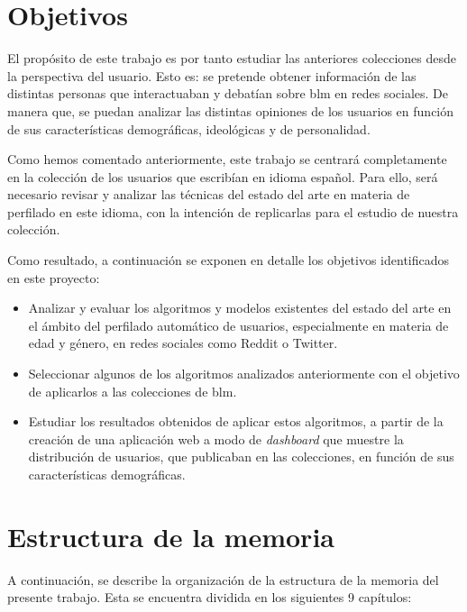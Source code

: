\section{Objetivos}
El propósito de este trabajo es por tanto estudiar las anteriores colecciones desde la perspectiva del usuario. Esto es: se pretende obtener información de las distintas personas que interactuaban y debatían sobre \acrshort{blm} en redes sociales. De manera que, se puedan analizar las distintas opiniones de los usuarios en función de sus características demográficas, ideológicas y de personalidad.

Como hemos comentado anteriormente, este trabajo se centrará completamente en la colección de los usuarios que escribían en idioma español. Para ello, será necesario revisar y analizar las técnicas del estado del arte en materia de perfilado en este idioma, con la intención de replicarlas para el estudio de nuestra colección.

Como resultado, a continuación se exponen en detalle los objetivos identificados en este proyecto:

\begin{itemize}
    \item Analizar y evaluar los algoritmos y modelos existentes del estado del arte en el ámbito del perfilado automático  de usuarios, especialmente en materia de edad y género, en redes sociales como Reddit o Twitter.
    \item Seleccionar algunos de los algoritmos analizados anteriormente con el objetivo de aplicarlos a las colecciones de \acrshort{blm}.
    \item Estudiar los resultados obtenidos de aplicar estos algoritmos, a partir de la creación de una aplicación web a modo de \textit{dashboard} que muestre la distribución de usuarios, que publicaban en las colecciones, en función de sus características demográficas.
\end{itemize}

\section{Estructura de la memoria}
A continuación, se describe la organización de la estructura de la memoria del presente trabajo. Esta se encuentra dividida en los siguientes 9 capítulos:

